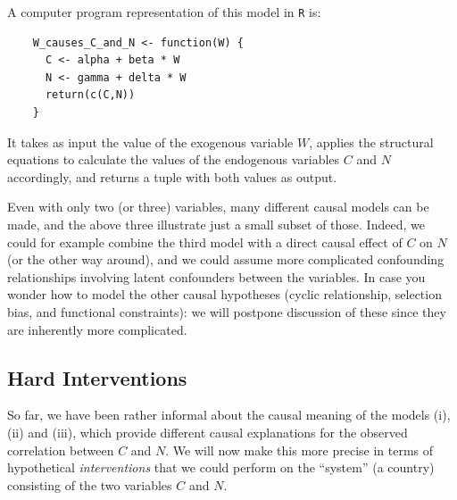 \begin{enumerate}[label=(\roman*)]
    A computer program representation of this model in \texttt{R} is:
    \begin{lstlisting}
    W_causes_C_and_N <- function(W) {
      C <- alpha + beta * W
      N <- gamma + delta * W
      return(c(C,N))
    }
    \end{lstlisting}
    It takes as input the value of the exogenous variable $W$, applies the structural equations to calculate the values of the endogenous variables $C$ and $N$ accordingly, and returns a tuple with both values as output.
\end{enumerate}
Even with only two (or three) variables, many different causal models can be made, and the above three illustrate just a small subset of those. Indeed, we could for example combine the third model with a direct causal effect of $C$ on $N$ (or the other way around), and we could assume more complicated confounding relationships involving latent confounders between the variables.
In case you wonder how to model the other causal hypotheses (cyclic relationship, selection bias, and functional constraints):
we will postpone discussion of these since they are inherently more complicated.

\subsection{Hard Interventions}

So far, we have been rather informal about the causal meaning of the models (i), (ii) and (iii), which provide different causal explanations for the observed correlation between $C$ and $N$. 
We will now make this more precise in terms of hypothetical \emph{interventions} that we could perform on the ``system'' (a country) consisting of the two variables $C$ and $N$.


